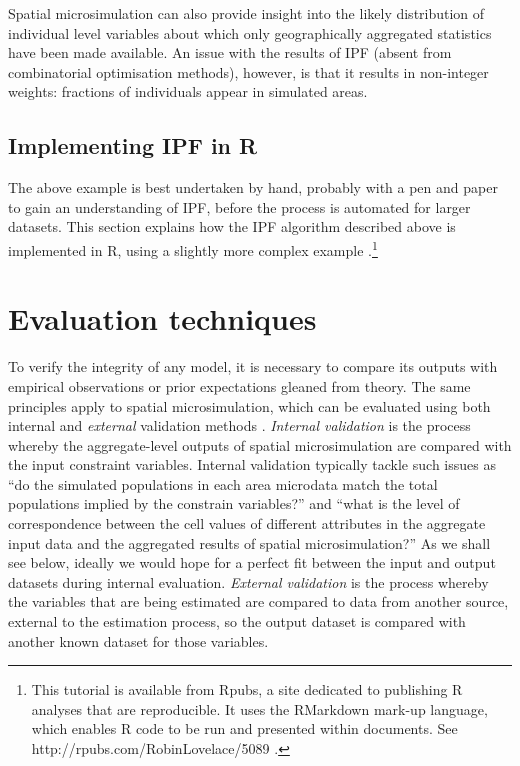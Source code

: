 \documentclass[a4paper,10pt]{article}
\begin{document}
Spatial microsimulation can also provide insight into the likely
distribution of individual level variables about which only
geographically aggregated statistics have been made available.
An issue
with the results of IPF (absent from combinatorial optimisation methods),
however, is that it results in non-integer weights: fractions of individuals
appear in simulated areas.

\subsection{Implementing IPF in R} \label{simplementing}
The above example is best undertaken by hand, probably with a pen and paper
to gain an understanding of IPF, before the process is automated for 
larger datasets. This section explains how the IPF
algorithm described above is implemented in R, using a slightly more
complex example
\citep{Lovelace2013-trs}.\footnote{This 
tutorial is available from Rpubs, a site dedicated
to publishing R analyses that are reproducible. It uses the RMarkdown
mark-up language, which enables R code to be run and presented within
documents. See http://rpubs.com/RobinLovelace/5089 \label{fnrpub} .
}

\section{Evaluation techniques}

To verify the integrity of any model, it is necessary to compare its outputs
with empirical observations or prior expectations gleaned from theory.
The same principles apply to spatial microsimulation, which can be evaluated using
both internal and \emph{external} validation methods \citep{Edwards2009}.
\emph{Internal validation} is the process whereby
the aggregate-level outputs of spatial microsimulation are compared with
the input constraint variables. Internal validation typically tackle such issues
as ``do the simulated populations in each area
microdata match the total populations implied by the constrain variables?''
and ``what is the level of correspondence between the cell values of different
attributes in the aggregate input data and the aggregated results of spatial microsimulation?''
As we shall see below, ideally we would hope for a perfect fit between the input
and output datasets during internal evaluation.
\emph{External validation} is the process whereby the variables that are
being estimated are compared to data from another source,
external to the estimation process, so the output dataset is compared with
another known dataset for those variables.
\end{document}

